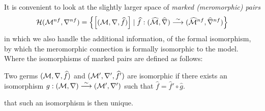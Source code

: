 It is convenient to look at the slightly larger space of \emph{marked
(meromorphic) pairs}
\[
  \mathcal{H}(\mathcal{M}^{nf},\nabla^{nf})=\left\{
    \left[(\mathcal{M},\nabla,\widehat f)\right]
      \mid
      \widehat f:(\widehat{\mathcal{M}},\widehat\nabla)
        \overset{\sim}\longrightarrow
        (\widehat{\mathcal{M}}^{nf},\widehat\nabla^{nf})
  \right\}
\]
in which we also handle the additional information, of the formal isomorphism,
by which the meromorphic connection is formally isomorphic to the model.
Where the isomorphisms of marked pairs are defined as follows:
\begin{defn}
  Two germs $(\mathcal{M},\nabla,\widehat f)$ and $(\mathcal{M}',\nabla',\widehat f')$ are
  isomorphic if there exists an isomorphism
  $g:(\mathcal{M},\nabla)\overset{\sim}\longrightarrow(\mathcal{M}',\nabla')$ such that
  $\hat f=\hat f'\circ \hat g$.
  \begin{s-rem}
     \cite[111]{sabbah2007isomonodromic} that such
    an isomorphism is then unique.
  \end{s-rem}
\end{defn}

